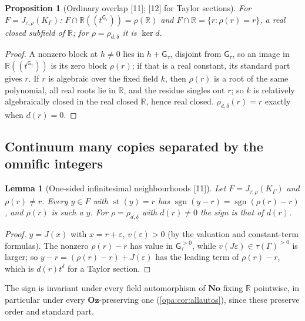 \documentclass[11pt,oneside]{article}
\numberwithin{equation}{section}
\newtheorem{proposition}[proposition]{Proposition}
\newtheorem{lemma}[lemma]{Lemma}
\theoremstyle{definition}
\theoremstyle{remark}
\newcommand{\No}{\mathbf{No}}
\newcommand{\Oz}{\mathbf{Oz}}
\newcommand{\R}{\mathbb R}
\newcommand{\st}{\operatorname{st}}
\newcommand{\Hahn}[2]{#1((t^{#2}))}
\newcommand{\src}[1]{\textup{\textsf{\small[#1]}}}
\newcommand{\gap}{\mathsf G}
\begin{document}
\begin{proposition}[Ordinary overlap \src{11}; \src{12} for Taylor sections]\label{opa:as:prop:overlap}
For $F=J_{\tau,\rho}(K_\Gamma)$: $F\cap\Hahn\R{\gap_\tau}=\rho(\R)$ and $F\cap\R=\{r:\rho(r)=r\}$, a real
closed subfield of $\R$; for $\rho=\rho_{d,\delta}$ it is $\ker d$.
\end{proposition}
\begin{proof}
A nonzero block at $h\ne0$ lies in $h+\gap_\tau$, disjoint from $\gap_\tau$, so an image in
$\Hahn\R{\gap_\tau}$ is its zero block $\rho(r)$; if that is a real constant, its standard part gives $r$. If
$r$ is algebraic over the fixed field $k$, then $\rho(r)$ is a root of the same polynomial, all real roots lie in
$\R$, and the residue singles out $r$; so $k$ is relatively algebraically closed in the real closed $\R$, hence
real closed. $\rho_{d,\delta}(r)=r$ exactly when $d(r)=0$.
\end{proof}

\subsection{Continuum many copies separated by the omnific integers}

\begin{lemma}[One-sided infinitesimal neighbourhoods \src{11}]\label{opa:as:lem:side}
Let $F=J_{\tau,\rho}(K_\Gamma)$ and $\rho(r)\ne r$. Every $y\in F$ with $\st(y)=r$ has
$\operatorname{sgn}(y-r)=\operatorname{sgn}(\rho(r)-r)$, and $\rho(r)$ is such a $y$. For $\rho=\rho_{d,\delta}$
with $d(r)\ne0$ the sign is that of $d(r)$.
\end{lemma}
\begin{proof}
$y=J(x)$ with $x=r+\varepsilon$, $v(\varepsilon)>0$ (by the valuation and constant-term formulas). The nonzero
$\rho(r)-r$ has value in $\gap_\tau^{>0}$, while $v(J\varepsilon)\in\tau(\Gamma)^{>0}$ is larger; so
$y-r=(\rho(r)-r)+J(\varepsilon)$ has the leading term of $\rho(r)-r$, which is $d(r)t^\delta$ for a Taylor section.
\end{proof}

The sign is invariant under every field automorphism of $\No$ fixing $\R$ pointwise, in particular under every
$\Oz$-preserving one (\cref{opa:cor:allautos}), since these preserve order and standard part.
\end{document}
